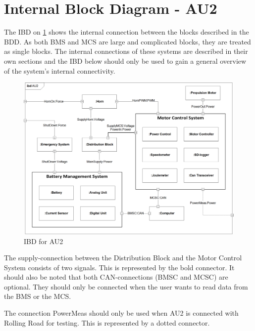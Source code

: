 \section{Internal Block Diagram - AU2}
The IBD on \ref{fig:IBD} shows the internal connection between the blocks described in the BDD. As both BMS and MCS are large and complicated blocks, they are treated as single blocks. The internal connections of these systems are described in their own sections and the IBD below should only be used to gain a general overview of the system's internal connectivity. 

\begin{figure}[H]
	\centering
	\includegraphics[width=1\linewidth]{Architecture/Diagrams/IBD_AU2}
	\caption{IBD for AU2}
	\label{fig:IBD}
\end{figure}

The supply-connection between the Distribution Block and the Motor Control System consists of two signals. This is represented by the bold connector. It should also be noted that both CAN-connections (BMSC and MCSC) are optional. They should only be connected when the user wants to read data from the BMS or the MCS.

The connection PowerMeas should only be used when AU2 is connected with Rolling Road for testing. This is represented by a dotted connector.
